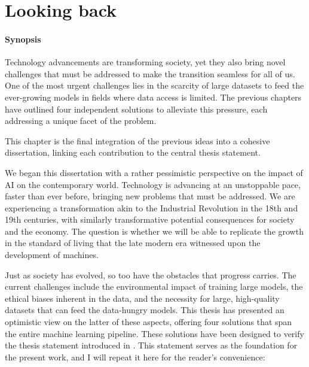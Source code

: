 \graphicspath{{ch7_discussion/}{Figures/}}

\chapter{Looking back}
\label{chapter:discussion}




\subsubsection{Synopsis} Technology advancements are transforming society, yet they also bring novel challenges that must be addressed to make the transition seamless for all of us. One of the most urgent challenges lies in the scarcity of large datasets to feed the ever-growing models in fields where data access is limited. The previous chapters have outlined four independent solutions to alleviate this pressure, each addressing a unique facet of the problem.

This chapter is the final integration of the previous ideas into a cohesive dissertation, linking each contribution to the central thesis statement. 

\sectionlinenew

We began this dissertation with a rather pessimistic perspective on the impact of AI on the contemporary world. Technology is advancing at an unstoppable pace, faster than ever before, bringing new problems that must be addressed. We are experiencing a transformation akin to the Industrial Revolution in the 18th and 19th centuries, with similarly transformative potential consequences for society and the economy. The question is whether we will be able to replicate the growth in the standard of living that the late modern era witnessed upon the development of machines.

Just as society has evolved, so too have the obstacles that progress carries. The current challenges include the environmental impact of training large models, the ethical biases inherent in the data, and the necessity for large, high-quality datasets that can feed the data-hungry models. This thesis has presented an optimistic view on the latter of these aspects, offering four solutions that span the entire machine learning pipeline. These solutions have been designed to verify the thesis statement introduced in . This statement serves as the foundation for the present work, and I will repeat it here for the reader's convenience:
\\

